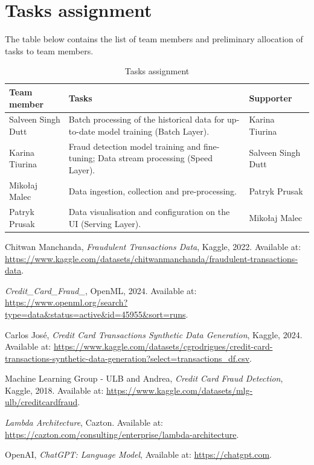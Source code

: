 \documentclass[12pt,a4paper, hidelinks]{article}
\begin{document}
\section{Tasks assignment}

The table below contains the list of team members and preliminary allocation of tasks to team members.

\begin{table}[htbp]
\centering
\begin{tabular}{|p{4cm}|p{6.5cm}|p{4cm}|}
\hline
\textbf{Team member} & \textbf{Tasks} & \textbf{Supporter} \\
\hline
Salveen Singh Dutt & Batch processing of the historical data for up-to-date model training (Batch Layer). & Karina Tiurina \\
\hline
Karina Tiurina & Fraud detection model training and fine-tuning; Data stream processing (Speed Layer). & Salveen Singh Dutt \\
\hline
Mikołaj Malec & Data ingestion, collection and pre-processing. & Patryk Prusak  \\
\hline
Patryk Prusak & Data visualisation and configuration on the UI (Serving Layer). & Mikołaj Malec \\
\hline
\end{tabular}
\caption{Tasks assignment}
\end{table}

\newpage

\begin{thebibliography}{9}

    Chitwan Manchanda,
    \textit{Fraudulent Transactions Data},
    Kaggle, 2022.
    Available at: \url{https://www.kaggle.com/datasets/chitwanmanchanda/fraudulent-transactions-data}.
    
    \textit{Credit\_Card\_Fraud\_},
    OpenML, 2024.
    Available at: \url{https://www.openml.org/search?type=data&status=active&id=45955&sort=runs}.

    Carlos José,
    \textit{Credit Card Transactions Synthetic Data Generation},
    Kaggle, 2024.
    Available at: \url{https://www.kaggle.com/datasets/cgrodrigues/credit-card-transactions-synthetic-data-generation?select=transactions_df.csv}.
    
    Machine Learning Group - ULB and Andrea,
    \textit{Credit Card Fraud Detection},
    Kaggle, 2018.
    Available at: \url{https://www.kaggle.com/datasets/mlg-ulb/creditcardfraud}.
    

    \textit{Lambda Architecture},
    Cazton.
    Available at: \url{https://cazton.com/consulting/enterprise/lambda-architecture}.

    OpenAI,
    \textit{ChatGPT: Language Model},
    Available at: \url{https://chatgpt.com}.
    
    \end{thebibliography}
\end{document}

